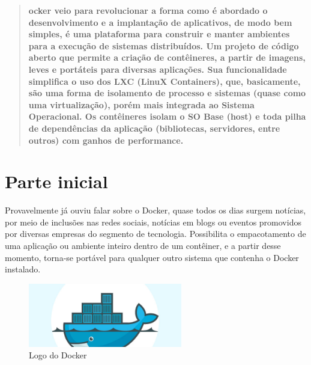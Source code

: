 \documentclass[a4paper,11pt]{article}
\begin{document}
	
\maketitle %
\thispagestyle{fancy} %

\begin{abstract}
	\textbf{ocker \cite{dockeroficial} veio para revolucionar a forma como é abordado o desenvolvimento e a implantação de aplicativos, de modo bem simples, é uma plataforma para construir e manter ambientes para a execução de sistemas distribuídos. Um projeto de código aberto que permite a criação de contêineres, a partir de imagens, leves e portáteis para diversas aplicações. Sua funcionalidade simplifica o uso dos LXC (LinuX Containers), que, basicamente, são uma forma de isolamento de processo e sistemas (quase como uma virtualização), porém mais integrada ao Sistema Operacional. Os contêineres isolam o SO Base (host) e toda pilha de dependências da aplicação (bibliotecas, servidores, entre outros) com ganhos de performance.}
\end{abstract}

\section{Parte inicial}
Provavelmente já ouviu falar sobre o Docker, quase todos os dias surgem notícias, por meio de inclusões nas redes sociais, notícias em blogs ou eventos promovidos por diversas empresas do segmento de tecnologia. Possibilita o empacotamento de uma aplicação ou ambiente inteiro dentro de um contêiner, e a partir desse momento, torna-se portável para qualquer outro sistema que contenha o Docker instalado.
\begin{figure}[H]
	\centering
	\includegraphics[width=0.6\textwidth]{imagem/DockerLogo.jpg}
	\caption{Logo do Docker}
\end{figure}
\end{document}
